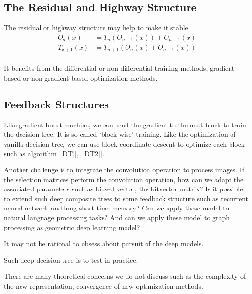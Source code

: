 \documentclass[UTF8]{article}
\begin{document}
\subsection{The Residual and Highway Structure}

The  residual or highway structure may help to make it stable:
\begin{equation}\label{Res}
  \begin{split}
    O_n(x) &=T_n(O_{n-1}(x))+ O_{n-1}(x)\\ \nonumber
    T_{n+1}(x)&= T_{n+1}(O_{n}(x) + O_{n-1}(x))\\ \nonumber
  \end{split}
\end{equation}


It benefits from the differential or non-differential training methods, gradient-based or non-gradient based
optimization methods.

\subsection{Feedback Structures}

Like gradient boost machine, we can send the gradient to the next block to train the decision tree.
It is so-called `block-wise' training.
Like the optimization of vanilla decision tree,
we can use block coordinate descent to optimize each  block such as algorithm [\ref{DT}], [\ref{DT2}].

Another challenge is to integrate the convolution operation to process images.
If the selection matrices perform the convolution operation,
how can we adapt the associated parameters such as biased vector, the bitvector matrix?
Is it possible to extend such deep composite trees to some feedback structure
such as recurrent neural network and long-short time memory?
Can we apply these model to natural language processing tasks?
And can we apply these model to graph processing as geometric deep learning model?

It may not be rational to obsess about pursuit of the deep models.

Such deep decision tree is to test in practice.


There are many theoretical concerns we do not discuss such as
the complexity  of the new representation, convergence of new optimization methods.
\fi


\end{document}
